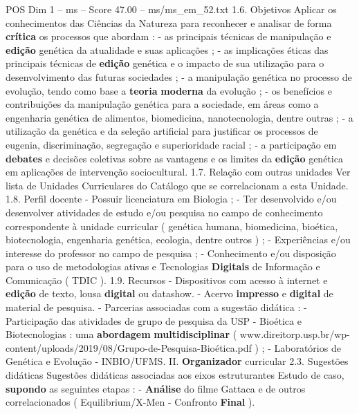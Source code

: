 \begin{textsample}{POS Dim 1 – ms – Score 47.00 – ms/ms\_em\_52.txt}  \label{ex:f1_pos_186}
1.6.
Objetivos Aplicar os conhecimentos das Ciências da Natureza para reconhecer e analisar de forma \textbf{crítica} os processos que abordam : - as principais técnicas de manipulação e \textbf{edição} genética da atualidade e suas aplicações ; - as implicações éticas das principais técnicas de \textbf{edição} genética e o impacto de sua utilização para o desenvolvimento das futuras sociedades ; - a manipulação genética no processo de evolução, tendo como base a \textbf{teoria} \textbf{moderna} da evolução ; - os benefícios e contribuições da manipulação genética para a sociedade, em áreas como a engenharia genética de alimentos, biomedicina, nanotecnologia, dentre outras ; - a utilização da genética e da seleção artificial para justificar os processos de eugenia, discriminação, segregação e superioridade racial ; - a participação em \textbf{debates} e decisões coletivas sobre as vantagens e os limites da \textbf{edição} genética em aplicações de intervenção sociocultural. 1.7.
Relação com outras unidades Ver lista de Unidades Curriculares do Catálogo que se correlacionam a esta Unidade. 1.8.
Perfil docente - Possuir licenciatura em Biologia ; - Ter desenvolvido e/ou desenvolver atividades de estudo e/ou pesquisa no campo de conhecimento correspondente à unidade curricular ( genética humana, biomedicina, bioética, biotecnologia, engenharia genética, ecologia, dentre outros ) ; - Experiências e/ou interesse do professor no campo de pesquisa ; - Conhecimento e/ou disposição para o uso de metodologias ativas e Tecnologias \textbf{Digitais} de Informação e Comunicação ( TDIC ). 1.9.
Recursos - Dispositivos com acesso à internet e \textbf{edição} de texto, lousa \textbf{digital} ou datashow. - Acervo \textbf{impresso} e \textbf{digital} de material de pesquisa. - Parcerias associadas com a sugestão didática : - Participação das atividades de grupo de pesquisa da USP - Bioética e Biotecnologias : uma \textbf{abordagem} \textbf{multidisciplinar} ( www.direitorp.usp.br/wp-content/uploads/2019/08/Grupo-de-Pesquisa-Bioética.pdf ) ; - Laboratórios de Genética e Evolução - INBIO/UFMS.
II. \textbf{Organizador} curricular 2.3.
Sugestões didáticas Sugestões didáticas associadas aos eixos estruturantes Estudo de caso, \textbf{supondo} as seguintes etapas : - \textbf{Análise} do filme Gattaca e de outros correlacionados ( Equilibrium/X-Men - Confronto \textbf{Final} ).

\end{textsample}
